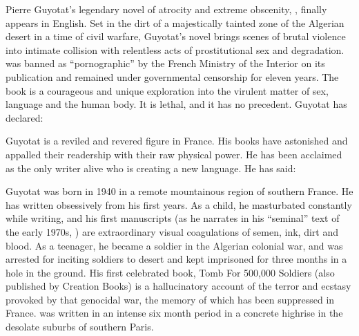 \documentclass[10pt,twoside]{memoir}
\begin{document}
Pierre Guyotat's legendary novel of atrocity and extreme obscenity, ,
finally appears in English. Set in the dirt of a majestically tainted zone of the Algerian desert in
a time of civil warfare, Guyotat's novel brings scenes of brutal violence into intimate collision
with relentless acts of prostitutional sex and degradation.  was banned as
\enquote{pornographic} by the French Ministry of the Interior on its publication and remained under
governmental censorship for eleven years. The book is a courageous and unique exploration into the
virulent matter of sex, language and the human body. It is lethal, and it has no precedent. Guyotat
has declared: 

Guyotat is a reviled and revered figure in France. His books have astonished and appalled their
readership with their raw physical power. He has been acclaimed as the only writer alive who is
creating a new language. He has said: 

Guyotat was born in 1940 in a remote mountainous region of southern France. He has written
obsessively from his first years. As a child, he masturbated constantly while writing, and his first
manuscripts (as he narrates in his \enquote{seminal} text of the early 1970s, ) are extraordinary visual coagulations of semen, ink, dirt and blood. As a
teenager, he became a soldier in the Algerian colonial war, and was arrested for inciting soldiers
to desert and kept imprisoned for three months in a hole in the ground. His first celebrated book,
Tomb For 500,000 Soldiers (also published by Creation Books) is a hallucinatory account of the
terror and ecstasy provoked by that genocidal war, the memory of which has been suppressed in
France.  was written in an intense six month period in a concrete highrise
in the desolate suburbs of southern Paris.
\end{document}
